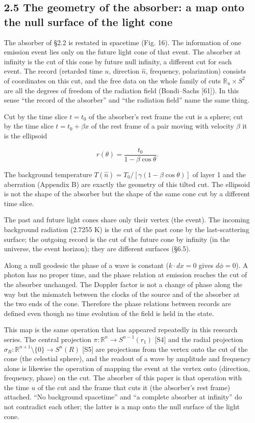 \documentclass[
  a4paper,
]{article}
\begin{document}
\subsection{2.5 The geometry of the absorber: a map onto the null
surface of the light
cone}\label{the-geometry-of-the-absorber-a-map-onto-the-null-surface-of-the-light-cone}

The absorber of §2.2 is restated in spacetime (Fig. 16). The information
of one emission event lies only on the future light cone of that event.
The absorber at infinity is the cut of this cone by future null
infinity, a different cut for each event. The record (retarded time
\(u\), direction \(\hat n\), frequency, polarization) consists of
coordinates on this cut, and the free data on the whole family of cuts
\(\mathbb R_u\times S^2\) are all the degrees of freedom of the
radiation field (Bondi--Sachs {[}61{]}). In this sense ``the record of
the absorber'' and ``the radiation field'' name the same thing.

Cut by the time slice \(t=t_0\) of the absorber's rest frame the cut is
a sphere; cut by the time slice \(t=t_0+\beta x\) of the rest frame of a
pair moving with velocity \(\beta\) it is the ellipsoid

\[
r(\theta)=\frac{t_0}{1-\beta\cos\theta}.
\]

The background temperature \(T(\hat n)=T_0/[\gamma(1-\beta\cos\theta)]\)
of layer 1 and the aberration (Appendix B) are exactly the geometry of
this tilted cut. The ellipsoid is not the shape of the absorber but the
shape of the same cone cut by a different time slice.

The past and future light cones share only their vertex (the event). The
incoming background radiation (2.7255 K) is the cut of the past cone by
the last-scattering surface; the outgoing record is the cut of the
future cone by infinity (in the universe, the event horizon); they are
different surfaces (§6.5).

Along a null geodesic the phase of a wave is constant (\(k\cdot dx=0\)
gives \(d\phi=0\)). A photon has no proper time, and the phase relation
at emission reaches the cut of the absorber unchanged. The Doppler
factor is not a change of phase along the way but the mismatch between
the clocks of the source and of the absorber at the two ends of the
cone. Therefore the phase relations between records are defined even
though no time evolution of the field is held in the state.

This map is the same operation that has appeared repeatedly in this
research series. The central projection
\(\pi:\mathbb R^n\to S^{n-1}(r_1)\) {[}S4{]} and the radial projection
\(\sigma_R:\mathbb R^{n+1}\setminus\{0\}\to S^n(R)\) {[}S5{]} are
projections from the vertex onto the cut of the cone (the celestial
sphere), and the readout of a wave by amplitude and frequency alone is
likewise the operation of mapping the event at the vertex onto
(direction, frequency, phase) on the cut. The absorber of this paper is
that operation with the time \(u\) of the cut and the frame that cuts it
(the absorber's rest frame) attached. ``No background spacetime'' and
``a complete absorber at infinity'' do not contradict each other; the
latter is a map onto the null surface of the light cone.
\end{document}

